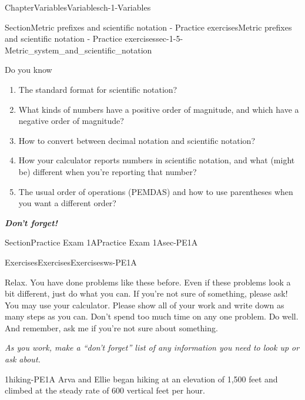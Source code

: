 \documentclass[twoside,11pt,]{book}
\newcommand{\alert}[1]{\textbf{\textit{#1}}}
\newlength{\fillinmaxwidth}
\newlength{\fillincontract}
\newlength{\charmaxwidth}\setlength{\charmaxwidth}{0.5em}
\newlength{\charminwidth}\setlength{\charminwidth}{0.1em}
\newlength{\fillinheight}
\newcommand{\fillintext}[1]{%
\setlength{\fillinmaxwidth}{#1\charmaxwidth}%
\setlength{\fillincontract}{#1\charminwidth}%
\setlength{\fillinheight}{\baselineskip}\addtolength{\fillinheight}{1.2pt}%
\strut\nobreak\leaders\vbox{\hrule width 0.3pt height 0.3pt \vskip -1.2pt}\hskip 1\fillinmaxwidth minus \fillincontract\nobreak\strut%
}
\newlength{\workspacestrutwidth}
\numberwithin{equation}{section}
\begin{document}
\begin{chapterptx}{Chapter}{Variables}{}{Variables}{}{}{ch-1-Variables}
\begin{sectionptx}{Section}{Metric prefixes and scientific notation - Practice exercises}{}{Metric prefixes and scientific notation - Practice exercises}{}{}{sec-1-5-Metric_system_and_scientific_notation}
\begin{conclusion}{Do you know \textellipsis{}}
\begin{enumerate}[label={\Alph*.}]
\item{}The standard format for scientific notation?%
\item{}What kinds of numbers have a positive order of magnitude, and which have a negative order of magnitude?%
\item{}How to convert between decimal notation and scientific notation?%
\item{}How your calculator reports numbers in scientific notation, and what (might be) different when you're reporting that number?%
\item{}The usual order of operations (PEMDAS) and how to use parentheses when you want a different order?%
\end{enumerate}
%
\par
\alert{Don't forget!}%
\end{conclusion}%
\end{sectionptx}
%
%
\typeout{************************************************}
\typeout{************************************************}
%
\begin{sectionptx}{Section}{Practice Exam 1A}{}{Practice Exam 1A}{}{}{sec-PE1A}
%
%
\typeout{************************************************}
\typeout{************************************************}
%
\begin{exercises-subsection-numberless}{Exercises}{Exercises}{}{Exercises}{}{}{ws-PE1A}
\begin{introduction}{}%
Relax. You have done problems like these before. Even if these problems look a bit different, just do what you can. If you're not sure of something, please ask! You may use your calculator. Please show all of your work and write down as many steps as you can. Don't spend too much time on any one problem. Do well. And remember, ask me if you're not sure about something.%
\par
\emph{As you work, make a ``don't forget'' list of any information you need to look up or ask about.}%
\end{introduction}%
\begin{divisionexercise}{1}{}{}{hiking-PE1A}%
Arva and Ellie began hiking at an elevation of 1,500 feet and climbed at the steady rate of 600 vertical feet per hour.%
\end{divisionexercise}
\end{exercises-subsection-numberless}
\end{sectionptx}
\end{chapterptx}
\end{document}
